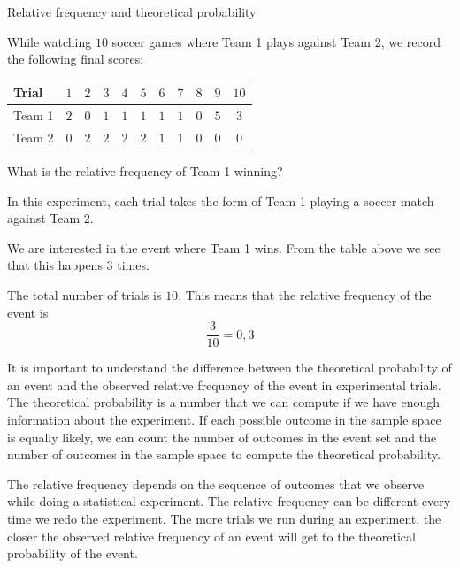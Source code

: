 \begin{wex}{Relative frequency and theoretical probability}
{While watching $10$ soccer games where Team 1 plays against Team 2, we
  record the following final scores:
    \begin{center}
      \begin{tabular}{lcccccccccc}
        \toprule
        Trial  & $1$ & $2$ & $3$ & $4$ & $5$ & $6$ & $7$ & $8$ & $9$ & $10$ \\
        \midrule
        Team 1 & $2$ & $0$ & $1$ & $1$ & $1$ & $1$ & $1$ & $0$ & $5$ & $3$ \\
        Team 2 & $0$ & $2$ & $2$ & $2$ & $2$ & $1$ & $1$ & $0$ & $0$ & $0$ \\
        \bottomrule
      \end{tabular}
    \end{center}

What is the relative frequency of Team 1 winning?
}{
  In this experiment, each trial takes the form of Team 1 playing a
  soccer match against Team 2.


  We are interested in the event where Team 1 wins. From the table
  above we see that this happens $3$ times.


  The total number of trials is $10$. This means that the relative
  frequency of the event is \[\frac{3}{10} = 0,3\]
}
\end{wex}

It is important to understand the difference between the theoretical
probability of an event and the observed relative frequency of the
event in experimental trials. The theoretical probability is a number
that we can compute if we have enough information about the
experiment. If each possible outcome in the sample space is
equally likely, we can count the number of outcomes in the event set
and the number of outcomes in the sample space to compute the
theoretical probability.\par

The relative frequency depends on the sequence of outcomes that we
observe while doing a statistical experiment. The relative frequency
can be different every time we redo the experiment. The more trials we
run during an experiment, the closer the observed relative frequency
of an event will get to the theoretical probability of the event.\par

